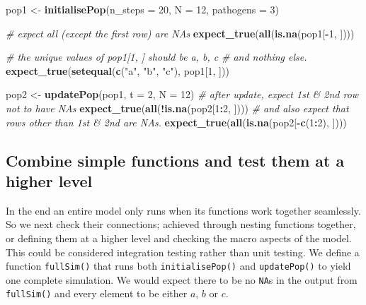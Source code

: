 \documentclass[]{elsarticle} %
\newenvironment{Shaded}{\begin{snugshade}}{\end{snugshade}}
\newcommand{\CommentTok}[1]{\textcolor[rgb]{0.56,0.35,0.01}{\textit{#1}}}
\newcommand{\DataTypeTok}[1]{\textcolor[rgb]{0.13,0.29,0.53}{#1}}
\newcommand{\DecValTok}[1]{\textcolor[rgb]{0.00,0.00,0.81}{#1}}
\newcommand{\KeywordTok}[1]{\textcolor[rgb]{0.13,0.29,0.53}{\textbf{#1}}}
\newcommand{\NormalTok}[1]{#1}
\newcommand{\OperatorTok}[1]{\textcolor[rgb]{0.81,0.36,0.00}{\textbf{#1}}}
\newcommand{\StringTok}[1]{\textcolor[rgb]{0.31,0.60,0.02}{#1}}
\begin{document}
\begin{Shaded}
\begin{Highlighting}[]
\NormalTok{pop1 <-}\StringTok{ }\KeywordTok{initialisePop}\NormalTok{(}\DataTypeTok{n_steps =} \DecValTok{20}\NormalTok{, }\DataTypeTok{N =} \DecValTok{12}\NormalTok{, }\DataTypeTok{pathogens =} \DecValTok{3}\NormalTok{) }

\CommentTok{# expect all (except the first row) are NAs}
\KeywordTok{expect_true}\NormalTok{(}\KeywordTok{all}\NormalTok{(}\KeywordTok{is.na}\NormalTok{(pop1[}\OperatorTok{-}\DecValTok{1}\NormalTok{, ]))) }

\CommentTok{# the unique values of pop1[1, ] should be a, b, c}
\CommentTok{#   and nothing else.}
\KeywordTok{expect_true}\NormalTok{(}\KeywordTok{setequal}\NormalTok{(}\KeywordTok{c}\NormalTok{(}\StringTok{"a"}\NormalTok{, }\StringTok{"b"}\NormalTok{, }\StringTok{"c"}\NormalTok{), pop1[}\DecValTok{1}\NormalTok{, ])) }

\NormalTok{pop2 <-}\StringTok{ }\KeywordTok{updatePop}\NormalTok{(pop1, }\DataTypeTok{t =} \DecValTok{2}\NormalTok{, }\DataTypeTok{N =} \DecValTok{12}\NormalTok{)}
\CommentTok{# after update, expect 1st & 2nd row not to have NAs}
\KeywordTok{expect_true}\NormalTok{(}\KeywordTok{all}\NormalTok{(}\OperatorTok{!}\KeywordTok{is.na}\NormalTok{(pop2[}\DecValTok{1}\OperatorTok{:}\DecValTok{2}\NormalTok{, ]))) }
\CommentTok{# and also expect that rows other than 1st & 2nd are NAs.}
\KeywordTok{expect_true}\NormalTok{(}\KeywordTok{all}\NormalTok{(}\KeywordTok{is.na}\NormalTok{(pop2[}\OperatorTok{-}\KeywordTok{c}\NormalTok{(}\DecValTok{1}\OperatorTok{:}\DecValTok{2}\NormalTok{), ]))) }
\end{Highlighting}
\end{Shaded}

\hypertarget{combine}{%
\subsection*{Combine simple functions and test them at a higher level}\label{combine}}

In the end an entire model only runs when its functions work together seamlessly.
So we next check their connections; achieved through nesting functions together, or defining them at a higher level and checking the macro aspects of the model.
This could be considered integration testing rather than unit testing.
We define a function \texttt{fullSim()} that runs both \texttt{initialisePop()} and \texttt{updatePop()} to yield one complete simulation.
We would expect there to be no \texttt{NA}s in the output from \texttt{fullSim()} and every element to be either \(a\), \(b\) or \(c\).
\newline
{}\label{combinesimplefunc}
\end{document}
